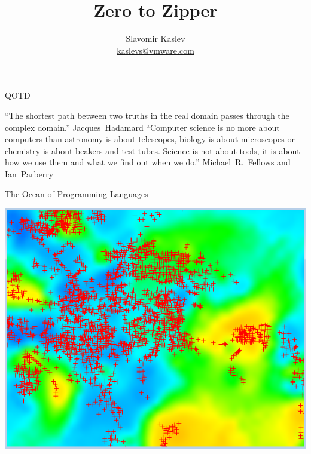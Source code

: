 \documentclass[pdf]{beamer}
\title{Zero to Zipper}
\author{Slavomir Kaslev \\
  \href{mailto:kaslevs@vmware.com}{kaslevs@vmware.com}}
\begin{document}
\begin{frame}
  \titlepage
\end{frame}

\begin{frame}{QOTD}
  \begin{outline}
    \1 ``The shortest path between two truths in the real domain passes through the complex domain.'' \mbox{Jacques Hadamard}
    \vspace{1cm}
    \1 ``Computer science is no more about computers than astronomy is about telescopes, biology is about microscopes or chemistry is about beakers and test tubes. Science is not about tools, it is about how we use them and what we find out when we do.'' \mbox{Michael R. Fellows} and \mbox{Ian Parberry}
  \end{outline}
\end{frame}


\begin{frame}{The Ocean of Programming Languages}
  \begin{center}
    \includegraphics[scale=0.7]{images/points}
  \end{center}
\end{frame}
\end{document}
